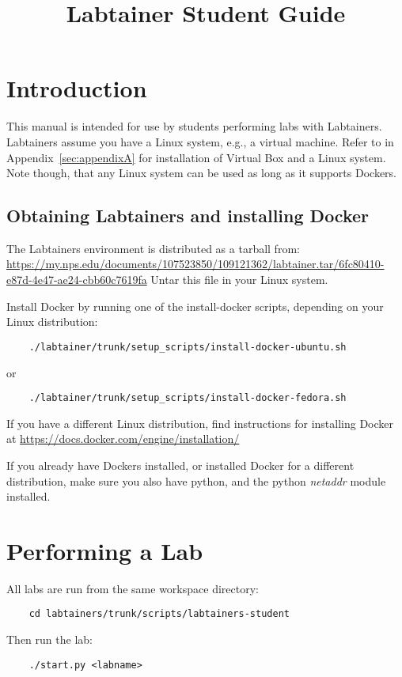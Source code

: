 \documentclass{article}
\begin{document}
\title {Labtainer Student Guide}
\maketitle

\section {Introduction}
This manual is intended for use by students performing labs with Labtainers.
Labtainers assume you have a Linux system, e.g., a virtual machine.  Refer to
in Appendix~\ref{sec:appendixA} for installation of Virtual Box and a Linux system.
Note though, that any Linux system can be used as long as it supports Dockers.

\subsection{Obtaining Labtainers and installing Docker}
The Labtainers environment is distributed as a tarball from:
\url{https://my.nps.edu/documents/107523850/109121362/labtainer.tar/6fc80410-e87d-4e47-ae24-cbb60c7619fa}
Untar this file in your Linux system.

Install Docker by running one of the install-docker scripts, depending on your Linux
distribution:
\begin{verbatim}
    ./labtainer/trunk/setup_scripts/install-docker-ubuntu.sh
\end{verbatim}
\noindent or 
\begin{verbatim}
    ./labtainer/trunk/setup_scripts/install-docker-fedora.sh
\end{verbatim}
If you have a different Linux distribution, find instructions for installing Docker at
\url{https://docs.docker.com/engine/installation/}

If you already have Dockers installed, or installed Docker for a different distribution,
make sure you also have python, and
the python \textit{netaddr} module installed.

\section{Performing a Lab}
All labs are run from the same workspace directory:
\begin{verbatim}
    cd labtainers/trunk/scripts/labtainers-student
\end{verbatim}
\noindent Then run the lab:
\begin{verbatim}
    ./start.py <labname>
\end{verbatim}
\end{document}
